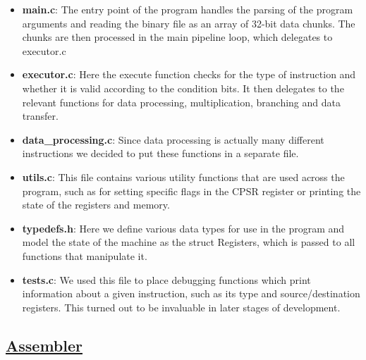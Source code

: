 \documentclass[10pt]{article}
\begin{document}
\begin{itemize}
\item \textbf{main.c}: The entry point of the program handles the parsing of the program arguments and reading the binary file as an array of 32-bit data chunks. The chunks are then processed in the main pipeline loop, which delegates to executor.c
\item \textbf{executor.c}: Here the execute function checks for the type of instruction and whether it is valid according to the condition bits. It then delegates to the relevant functions for data processing, multiplication, branching and data transfer.
\item \textbf{data\_processing.c}: Since data processing is actually many different instructions we decided to put these functions in a separate file.
\item \textbf{utils.c}: This file contains various utility functions that are used across the program, such as for setting specific flags in the CPSR register or printing the state of the registers and memory.
\item \textbf{typedefs.h}: Here we define various data types for use in the program and model the state of the machine as the struct Registers, which is passed to all functions that manipulate it.
\item \textbf{tests.c}: We used this file to place debugging functions which print information about a given instruction, such as its type and source/destination registers. This turned out to be invaluable in later stages of development.
\end{itemize}

\subsection{\underline{Assembler}}
\bigskip
\end{document}
